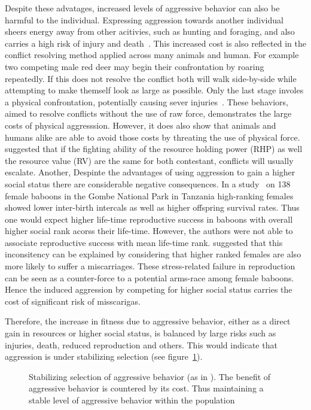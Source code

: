 Despite these advatages, increased levels of aggressive behavior can also be harmful to the individual.
Expressing aggression towards another individual sheers energy away from other acitivies, such as hunting and foraging, and also carries a high risk of injury and death~\cite{Packer1995}.  
This increased cost is also reflected in the conflict resolving method applied across many animals and human.
For example two competing male red deer may begin their confrontation by roaring repeatedly.
If this does not resolve the conflict both will walk side-by-side while attempting to make themself look as large as possible.
Only the last stage involes a physical confrontation, potentially causing sever injuries~\cite{Clutton-Brock1979a}.
These behaviors, aimed to resolve conflicts without the use of raw force, demonstrates the large costs of physical aggresssion.
However, it does also show that animals and humans alike are able to avoid those costs by threating the use of physical force.
\citet{Maxson2005} suggested that if the fighting ability of the resource holding power (RHP) as well the resource value (RV) are the same for both contestant, conflicts will usually escalate.
Another, 
Despinte the advantages of using aggression to gain a higher social status there are considerable negative consequences.
In a study~\cite{Packer1995} on 138 female baboons in the Gombe National Park in Tanzania high-ranking females showed lower inter-birth intercals as well as higher offspring survival rates.
Thus one would expect higher life-time reproductive success in baboons with overall higher social rank acorss their life-time.
However, the authors were not able to associate reproductive success with mean life-time rank.
\citet{Packer1995} suggested that this inconsitency can be explained by considering that higher ranked females are also more likely to suffer a  miscarriages.
These stress-related failure in reproduction can be seen as a counter-force to a potential arms-race among female baboons.
Hence the induced aggression by competing for higher social status carries the cost of significant risk of misscarigas.

Therefore, the increase in fitness due to aggressive behavior, either as a direct gain in resources or higher social status, is balanced by large risks such as injuries, death, reduced reproduction and others.
This would indicate that aggression is under stabilizing selection (see figure~\ref{fig:stab}).

\begin{figure}[hp]
	\centering
	\scalebox{0.6}{}
  \caption{Stabilizing selection of aggressive behavior (as in \citet{Anholt2012}). The benefit of aggressive behavior is countered by its cost. Thus maintaining a stable level of aggressive behavior within the population}
	\label{fig:stab}
\end{figure}

